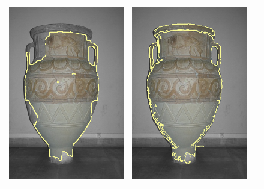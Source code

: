\documentclass[smallextended]{svjour3}       %
\begin{document}
{{\begin{figure}[ht!]
\begin{tabular}{ccc}
		\includegraphics[scale=0.2]{images/segmentation/bc/vase/gc-seg.png} &
		\includegraphics[scale=0.2]{images/segmentation/schoenemann/vase/vase-seg.png} &

\end{tabular}
\end{figure}}}
\end{document}
